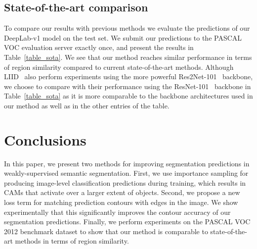 \documentclass{article}
\begin{document}
\subsection{State-of-the-art comparison}
\label{sec_sota_comparison}

To compare our results with previous methods we evaluate the predictions of our DeepLab-v1 model on the test set. We submit our predictions to the PASCAL VOC evaluation server exactly once, and present the results in Table~\ref{table_sota}. We see that our method reaches similar performance in terms of region similarity compared to current state-of-the-art methods. Although LIID~\cite{liu2020tpami} also perform experiments using the more powerful Res2Net-101~\cite{gao2021tpami} backbone, we choose to compare with their performance using the ResNet-101~\cite{he2016cvpr} backbone in Table~\ref{table_sota} as it is more comparable to the backbone architectures used in our method as well as in the other entries of the table.

\section{Conclusions}
\label{sec_conclusions}

In this paper, we present two methods for improving segmentation predictions in weakly-supervised semantic segmentation. First, we use importance sampling for producing image-level classification predictions during training, which results in CAMs that activate over a larger extent of objects. Second, we propose a new loss term for matching prediction contours with edges in the image. We show experimentally that this significantly improves the contour accuracy of our segmentation predictions. Finally, we perform experiments on the PASCAL VOC 2012 benchmark dataset to show that our method is comparable to state-of-the-art methods in terms of region similarity.

\newpage



\end{document}
